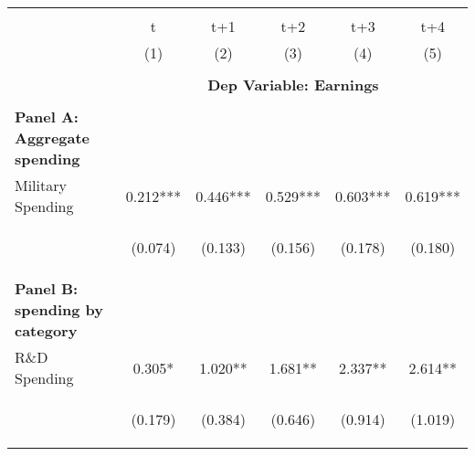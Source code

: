 
    \begin{tabular}{lccccc} \hline
    \vspace{-2pt} & \vspace{-2pt} & \vspace{-2pt} & \vspace{-2pt} & \vspace{-2pt} \\
     & t & t+1 & t+2 & t+3 & t+4 \\ 
     & (1) & (2) & (3) & (4) & (5) \\
    \hline
    \vspace{-1.5pt} & \vspace{-1.5pt} & \vspace{-1.5pt} & \vspace{-1.5pt} & \vspace{-1.5pt} \\
    &\multicolumn{5}{c}{\textbf{Dep Variable: Earnings}} \\ 
    \cmidrule{2-6}
      &  &  &  &  \\
   
    
   
    \multicolumn{1}{l}{\textbf{Panel A: Aggregate spending}} & & & & \\
    Military Spending & 0.212*** & 0.446*** & 0.529*** & 0.603*** & 0.619*** \\
    & \begin{footnotesize}(0.074)\end{footnotesize} & \begin{footnotesize}(0.133) \end{footnotesize} & \begin{footnotesize}(0.156)\end{footnotesize} & \begin{footnotesize}(0.178)\end{footnotesize} & \begin{footnotesize}(0.180)\end{footnotesize} \\
    
   \multicolumn{1}{l}{\textbf{Panel B: spending by category}} & & & & \\ 
   
    R\&D Spending & 0.305* & 1.020** & 1.681** & 2.337** & 2.614** \\
     & \begin{footnotesize}(0.179)\end{footnotesize} & \begin{footnotesize}(0.384)\end{footnotesize} & \begin{footnotesize}(0.646)\end{footnotesize} & \begin{footnotesize}(0.914)\end{footnotesize} & \begin{footnotesize}(1.019)\end{footnotesize} \\


\end{tabular}
